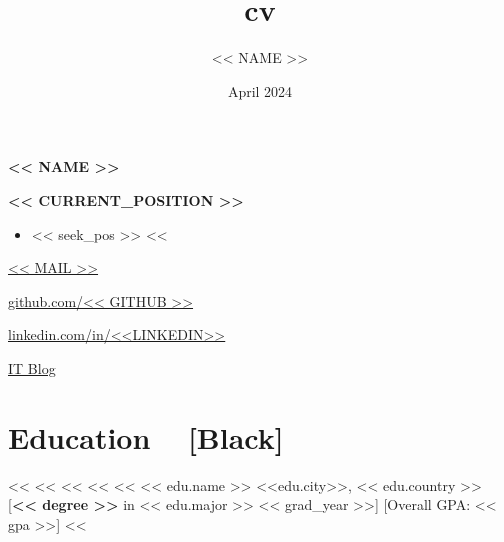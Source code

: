 \documentclass[10pt, a4paper]{article}
\title{cv}
\author{<< NAME >>}
\date{April 2024}
\newcommand{\myname}[1]{
        \color{black}
        \begin{center}
            {\LARGE \textbf{#1}}
        \end{center}
    }
\newcommand{\hl}[1]{{\color{Mahogany} #1}}
\newcommand{\mysec}[1]{\section*{\textbf{#1 ~} \xrfill[0.3\baselineskip]{0.1pt}[Black]}}
\newcommand{\myitemspace}{\setlength\itemsep{-2pt}}
\begin{document}

    \myname{<< NAME >>} %
    
    \begin{center}

        \textbf{\hl{<< CURRENT_POSITION >>}} \\
        
        \parbox{0.85\linewidth}{
            \vspace{1em} 
                \begin{itemize}
                    \myitemspace
                    <<%
                        \item << seek_pos >>
                    <<%
                \end{itemize}
            \vspace{1em}
        }
        
        \vspace{.5em}

        \begin{linkset}
            \item \href{mailto:<< MAIL >>}{<< MAIL >>}
            \item \href{https://github.com/<< GITHUB >>}{github.com/<< GITHUB >>}
            \item \href{https://www.linkedin.com/in/<<LINKEDIN>>}{linkedin.com/in/<<LINKEDIN>>}
            \item \href{<< IT_BLOG >>}{IT Blog}
        \end{linkset}

    \end{center}

    
    \mysec{Education} %
        <<%
            <<%
            <<%
            <<%
            <<%
            \manyitem
                {<< edu.name >> \hfill \hl{<<edu.city>>, << edu.country >>}}
                [\textbf{<< degree >>} in << edu.major >> \hfill \small << grad_year >>]
                [Overall GPA: << gpa >>]
        <<%
\end{document}
